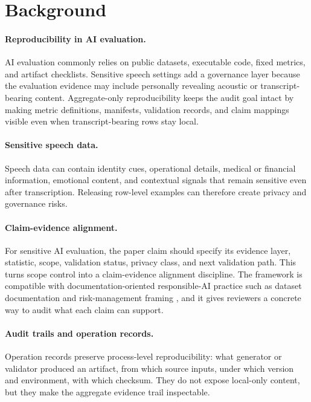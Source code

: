 \section{Background}

\paragraph{Reproducibility in AI evaluation.}
AI evaluation commonly relies on public datasets, executable code, fixed metrics, and artifact checklists. Sensitive speech settings add a governance layer because the evaluation evidence may include personally revealing acoustic or transcript-bearing content. Aggregate-only reproducibility keeps the audit goal intact by making metric definitions, manifests, validation records, and claim mappings visible even when transcript-bearing rows stay local.

\paragraph{Sensitive speech data.}
Speech data can contain identity cues, operational details, medical or financial information, emotional content, and contextual signals that remain sensitive even after transcription. Releasing row-level examples can therefore create privacy and governance risks.

\paragraph{Claim-evidence alignment.}
For sensitive AI evaluation, the paper claim should specify its evidence layer, statistic, scope, validation status, privacy class, and next validation path. This turns scope control into a claim-evidence alignment discipline. The framework is compatible with documentation-oriented responsible-AI practice such as dataset documentation \citep{datasheets} and risk-management framing \citep{nistairmf}, and it gives reviewers a concrete way to audit what each claim can support.

\paragraph{Audit trails and operation records.}
Operation records preserve process-level reproducibility: what generator or validator produced an artifact, from which source inputs, under which version and environment, with which checksum. They do not expose local-only content, but they make the aggregate evidence trail inspectable.
